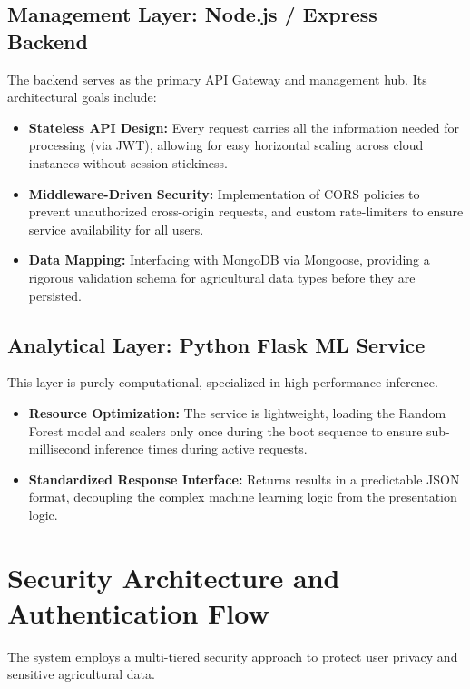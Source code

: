 \documentclass[12pt,a4paper]{report}
\begin{document}
\subsection{Management Layer: Node.js / Express Backend}
The backend serves as the primary API Gateway and management hub. Its architectural goals include:
\begin{itemize}
    \item \textbf{Stateless API Design:} Every request carries all the information needed for processing (via JWT), allowing for easy horizontal scaling across cloud instances without session stickiness.
    \item \textbf{Middleware-Driven Security:} Implementation of CORS policies to prevent unauthorized cross-origin requests, and custom rate-limiters to ensure service availability for all users.
    \item \textbf{Data Mapping:} Interfacing with MongoDB via Mongoose, providing a rigorous validation schema for agricultural data types before they are persisted.
\end{itemize}

\subsection{Analytical Layer: Python Flask ML Service}
This layer is purely computational, specialized in high-performance inference.
\begin{itemize}
    \item \textbf{Resource Optimization:} The service is lightweight, loading the Random Forest model and scalers only once during the boot sequence to ensure sub-millisecond inference times during active requests.
    \item \textbf{Standardized Response Interface:} Returns results in a predictable JSON format, decoupling the complex machine learning logic from the presentation logic.
\end{itemize}

\section{Security Architecture and Authentication Flow}
\label{sec:4.6}
The system employs a multi-tiered security approach to protect user privacy and sensitive agricultural data.
\end{document}
